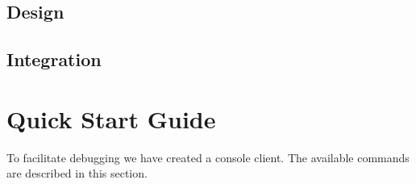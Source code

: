 \documentclass[a4paper,12pt]{article}
\begin{document}
\subsection{Design}

\subsection{Integration}




\setcounter{section}{4}

\section{Quick Start Guide}
To facilitate debugging we have created a console client. The available commands are described in this section.
\end{document}
